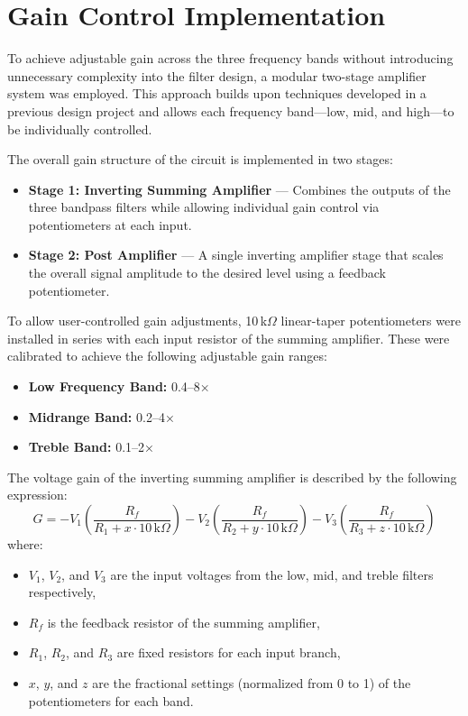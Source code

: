 \documentclass[12pt]{article}
\begin{document}
\section{Gain Control Implementation}

To achieve adjustable gain across the three frequency bands without introducing unnecessary complexity into the filter design, a modular two-stage amplifier system was employed. This approach builds upon techniques developed in a previous design project and allows each frequency band—low, mid, and high—to be individually controlled.

The overall gain structure of the circuit is implemented in two stages:
\begin{itemize}
	\item \textbf{Stage 1: Inverting Summing Amplifier} — Combines the outputs of the three bandpass filters while allowing individual gain control via potentiometers at each input.
	\item \textbf{Stage 2: Post Amplifier} — A single inverting amplifier stage that scales the overall signal amplitude to the desired level using a feedback potentiometer.
\end{itemize}

To allow user-controlled gain adjustments, 10\,k$\Omega$ linear-taper potentiometers were installed in series with each input resistor of the summing amplifier. These were calibrated to achieve the following adjustable gain ranges:
\begin{itemize}
	\item \textbf{Low Frequency Band:} 0.4–8×
	\item \textbf{Midrange Band:} 0.2–4×
	\item \textbf{Treble Band:} 0.1–2×
\end{itemize}

The voltage gain of the inverting summing amplifier is described by the following expression:
\[
	G = -V_1\left(\frac{R_f}{R_1 + x \cdot 10\,\text{k}\Omega}\right)
	-V_2\left(\frac{R_f}{R_2 + y \cdot 10\,\text{k}\Omega}\right)
	-V_3\left(\frac{R_f}{R_3 + z \cdot 10\,\text{k}\Omega}\right)
\]
where:
\begin{itemize}
	\item $V_1$, $V_2$, and $V_3$ are the input voltages from the low, mid, and treble filters respectively,
	\item $R_f$ is the feedback resistor of the summing amplifier,
	\item $R_1$, $R_2$, and $R_3$ are fixed resistors for each input branch,
	\item $x$, $y$, and $z$ are the fractional settings (normalized from 0 to 1) of the potentiometers for each band.
\end{itemize}
\end{document}
